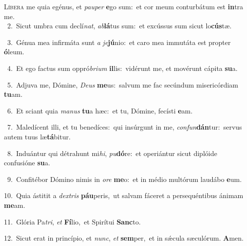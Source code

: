 \lettrine{\initial\textcolor{\initialcolor}{L}}{íbera} me quia egénus, et \textit{pau}\-\textit{per} \textbf{e}\-go sum:~\star et cor meum conturbátum est \textbf{in}\-tra me.\\
{\numbfont\textcolor{\numbcolor}{~2.}}~Sicut umbra cum declí\-\textit{nat}\-, \textit{ab}\-\textbf{lá}tus sum:~\star et excússus sum sicut lo\-\textbf{cús}\-tæ.\par
{\numbfont\textcolor{\numbcolor}{~3.}}~Génua mea infirmáta sunt \textit{a} \textit{je}\-\textbf{jú}nio:~\star et caro mea immutáta est propter \textbf{ó}\-leum.\par
{\numbfont\textcolor{\numbcolor}{~4.}}~Et ego factus sum oppró\-\textit{bri}\-\textit{um} \textbf{il}\-lis:~\star vidérunt me, et movérunt cápita \textbf{su}\-a.\par
{\numbfont\textcolor{\numbcolor}{~5.}}~Adjuva me, Dómine, \textit{De}\-\textit{us} \textbf{me}\-us:~\star salvum me fac secúndum misericórdiam \textbf{tu}\-am.\par
{\numbfont\textcolor{\numbcolor}{~6.}}~Et sciant quia \textit{ma}\-\textit{nus} \textbf{tu}\-a hæc:~\star et tu, Dómine, fecísti \textbf{e}\-am.\par
{\numbfont\textcolor{\numbcolor}{~7.}}~Maledícent illi, et tu benedíces:~\dagger qui insúrgunt in me, \textit{con}\-\textit{fun}\textbf{dán}tur:~\star servus autem tuus læ\-\textbf{tá}\-bitur.\par
{\numbfont\textcolor{\numbcolor}{~8.}}~Induántur qui détrahunt mi\-\textit{hi}\-, \textit{pu}\-\textbf{dó}re:~\star et operiántur sicut diplóide confusióne \textbf{su}\-a.\par
{\numbfont\textcolor{\numbcolor}{~9.}}~Confitébor Dómino nimis in \textit{o}\-\textit{re} \textbf{me}\-o:~\star et in médio multórum laudábo \textbf{e}\-um.\par
{\numbfont\textcolor{\numbcolor}{10.}}~Quia ástitit a \textit{dex}\-\textit{tris} \textbf{páu}\-peris,~\star ut salvam fáceret a persequéntibus ánimam \textbf{me}\-am.\par
{\numbfont\textcolor{\numbcolor}{11.}}~Glória Pa\-\textit{tri}\-, \textit{et} \textbf{Fí}\-lio,~\star et Spirítui \textbf{Sanc}\-to.\par
{\numbfont\textcolor{\numbcolor}{12.}}~Sicut erat in princípio, et \textit{nunc}\-, \textit{et} \textbf{sem}\-per,~\star et in sǽcula sæculórum. \textbf{A}\-men.\par
